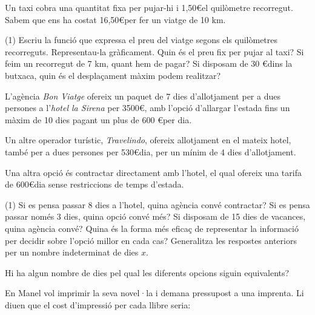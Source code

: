 \newpage

\begin{extrapage}

	Un taxi cobra una quantitat fixa per pujar-hi i 1,50\euro el quilòmetre recorregut. Sabem que ens ha
	costat 16,50\euro per fer un viatge de 10 km.

	\begin{tasks}(1)
		\task Escriu la funció que expressa el preu del viatge segons els quilòmetres recorreguts. 
			 Representau-la gràficament.
		\task Quin és el preu fix per pujar al taxi?
		\task Si feim un recorregut de 7 km, quant hem de pagar?
		\task Si disposam de 30 \euro dins la butxaca, quin és el desplaçament màxim podem realitzar?
	\end{tasks}

	\vspace{0.5cm}

	
	L'agència \textit{Bon Viatge}  ofereix un paquet de 7 dies d'allotjament per a dues persones a 
	l'\textit{hotel la Sirena} per 3500\euro, amb l'opció d'allargar l'estada fins un màxim de 10 dies 
	pagant un plus de 600 \euro per dia.
	
	Un altre operador turístic, \textit{Travelindo}, ofereix allotjament en el mateix hotel, 
	també per a dues persones per 530\euro dia, per un mínim de 4 dies d'allotjament.

	Una altra opció és contractar directament amb l'hotel, el qual ofereix una tarifa de 600\euro dia sense 
	restriccions de temps d'estada.

	\begin{tasks}(1)
		\task Si es pensa passar 8 dies a l'hotel, quina agència convé contractar?
		\task Si es pensa passar només 3 dies, quina opció convé més?
		\task Si disposam de 15 dies de vacances, quina agència convé?
		\task Quina és la forma més eficaç de representar la informació per decidir sobre
			  l'opció millor en cada cas? Generalitza les respostes anteriors per un nombre 
			  indeterminat de dies $x$.

		\task Hi ha algun nombre de dies pel qual les diferents opcions siguin equivalents? 
	\end{tasks}

	\vspace{0.5cm}

	
	En Manel vol imprimir la seva novel·la i demana pressupost a una imprenta. Li diuen que el cost 
	d'impressió per cada llibre seria:
	

\end{extrapage}
